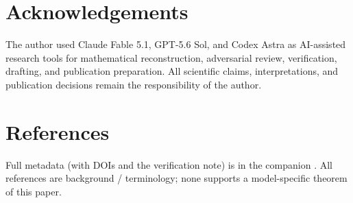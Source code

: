 \documentclass[
  11pt,
  a4paper,
]{article}
\newcounter{none} %
\begin{document}
\section{Acknowledgements}\label{acknowledgements}

The author used Claude Fable 5.1, GPT-5.6 Sol, and Codex Astra as AI-assisted research tools for mathematical reconstruction, adversarial review, verification, drafting, and publication preparation. All scientific claims, interpretations, and publication decisions remain the responsibility of the author.


\section{References}\label{references}

Full metadata (with DOIs and the verification note) is in the companion . All references are background / terminology; none supports a model-specific theorem of this paper.
\end{document}
